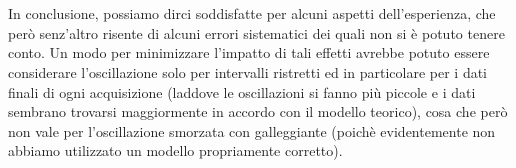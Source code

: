\documentclass{article}
\begin{document}
\\
\\
In conclusione, possiamo dirci soddisfatte per alcuni aspetti dell'esperienza, che però senz'altro risente di alcuni errori sistematici dei quali non si è potuto tenere conto. Un modo per minimizzare l'impatto di tali effetti avrebbe potuto essere considerare l'oscillazione solo per intervalli ristretti ed in particolare per i dati finali di ogni acquisizione (laddove le oscillazioni si fanno più piccole e i dati sembrano trovarsi maggiormente in accordo con il modello teorico), cosa che però non vale per l'oscillazione smorzata con galleggiante (poichè evidentemente non abbiamo utilizzato un modello propriamente corretto).
\end{document}
